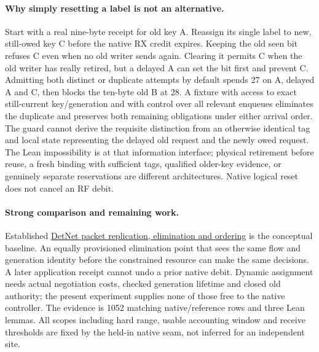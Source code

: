 \documentclass{article}
\begin{document}
\paragraph{Why simply resetting a label is not an alternative.}
Start with a real nine-byte receipt for old key A. Reassign its
single label to new, still-owed key C before the native RX credit
expires. Keeping the old seen bit refuses C even when no old
writer sends again. Clearing it permits C when the old writer has
really retired, but a delayed A can set the bit first and prevent
C. Admitting both distinct or duplicate attempts by default spends
27 on A, delayed A and C, then blocks the ten-byte old B at 28.
A fixture with access to exact still-current key/generation and
with control over all relevant enqueues eliminates the duplicate
and preserves both remaining obligations under either arrival
order. The guard cannot derive the requisite distinction from an
otherwise identical tag and local state representing the delayed
old request and the newly owed request. The Lean impossibility
is at that information interface; physical retirement before
reuse, a fresh binding with sufficient tags, qualified older-key
evidence, or genuinely separate reservations are different
architectures. Native logical reset does not cancel an RF debit.

\paragraph{Strong comparison and remaining work.}
Established
\href{https://www.rfc-editor.org/rfc/rfc8938.html#section-4.3}{DetNet
packet replication, elimination and ordering} is the conceptual
baseline. An equally provisioned elimination point that sees the
same flow and generation identity before the constrained resource
can make the same decisions. A later application receipt cannot
undo a prior native debit. Dynamic assignment needs actual
negotiation costs, checked generation lifetime and closed old
authority; the present experiment supplies none of those free
to the native controller. The evidence is 1052 matching
native/reference rows and three Lean lemmas. All scopes including
hard range, usable accounting window and receive thresholds are fixed by
the held-in native seam, not inferred for an independent site.
\end{document}
